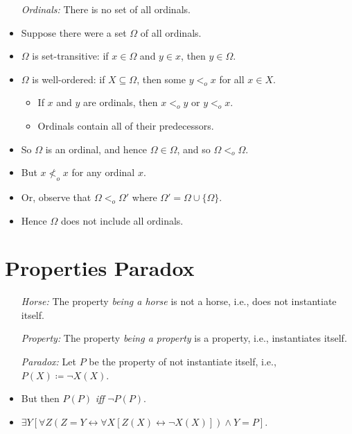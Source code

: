 \documentclass[a4paper, 11pt]{article} %
\newcommand{\set}[1]{\lbrace#1\rbrace} %
\begin{document}
  \begin{itemize}
    \item[\it Ordinals:] There is no set of all ordinals.
      \item Suppose there were a set $\Omega$ of all ordinals. 
      \item $\Omega$ is set-transitive: if $x \in \Omega$ and $y \in x$, then $y \in \Omega$. 
      \item $\Omega$ is well-ordered: if $X \subseteq \Omega$, then some $y <_o x$ for all $x\in X$. 
        \begin{itemize}
          \item If $x$ and $y$ are ordinals, then $x <_o y$ or $y <_o x$. 
          \item Ordinals contain all of their predecessors.
        \end{itemize}
      \item So $\Omega$ is an ordinal, and hence $\Omega \in \Omega$, and so $\Omega <_o \Omega$.
      \item But $x \nless_o x$ for any ordinal $x$. 
      \item Or, observe that $\Omega <_o \Omega'$ where $\Omega' = \Omega \cup \set{\Omega}$.
      \item Hence $\Omega$ does not include all ordinals. 
  \end{itemize}




\section*{Properties Paradox}

  \begin{itemize}
    \item[\it Horse:] The property \textit{being a horse} is not a horse, i.e., does not instantiate itself. 
    \item[\it Property:] The property \textit{being a property} is a property, i.e., instantiates itself.
    \item[\it Paradox:] Let $P$ be the property of not instantiate itself, i.e., $P(X) \coloneq \neg X(X)$.
      \item But then $P(P)$ \textit{iff} $\neg P(P)$.
      \item $\exists Y[\forall Z(Z = Y \leftrightarrow \forall X[Z(X) \leftrightarrow \neg X(X)]) \wedge Y = P]$. 
  \end{itemize}
\end{document}
